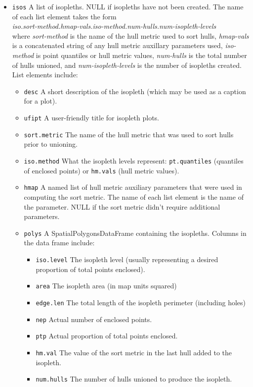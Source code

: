 \documentclass{article}
\begin{document}
\begin{itemize}
\begin{itemize}
  
  \end{itemize}

  \item \texttt{isos} A list of isopleths. NULL if isopleths have not been created. The name of each list element takes the form\\ \textit{iso.sort-method.hmap-vals.iso-method.num-hulls.num-isopleth-levels}\\  
where \textit{sort-method} is the name of the hull metric used to sort hulls, \textit{hmap-vals} is a concatenated string of any hull metric auxillary parameters used, \textit{iso-method} is point quantiles or hull metric values, \textit{num-hulls} is the total number of hulls unioned, and \textit{num-isopleth-levels} is the number of isopleths created. List elements include:
  
    \begin{itemize}
      \item \texttt{desc} A short description of the isopleth (which may be used as a caption for a plot).
      \item \texttt{ufipt} A user-friendly title for isopleth plots.
      \item \texttt{sort.metric} The name of the hull metric that was used to sort hulls prior to unioning.
      \item \texttt{iso.method} What the isopleth levels represent: \texttt{pt.quantiles} (quantiles of enclosed points) or \texttt{hm.vals} (hull metric values).
      \item \texttt{hmap} A named list of hull metric auxiliary parameters that were used in computing the sort metric. The name of each list element is the name of the parameter. NULL if the sort metric didn't require additional parameters.
      \item \texttt{polys} A SpatialPolygonsDataFrame containing the isopleths. Columns in the data frame include:
        \begin{itemize}
          \item \texttt{iso.level} The isopleth level (usually representing a desired proportion of total points enclosed).
          \item \texttt{area} The isopleth area (in map units squared)
          \item \texttt{edge.len} The total length of the isopleth perimeter (including holes)
          \item \texttt{nep} Actual number of enclosed points.
          \item \texttt{ptp} Actual proportion of total points enclosed.
          \item \texttt{hm.val} The value of the sort metric in the last hull added to the isopleth.
          \item \texttt{num.hulls} The number of hulls unioned to produce the isopleth.
        \end{itemize}
      

\end{itemize}
\end{itemize}
\end{document}
